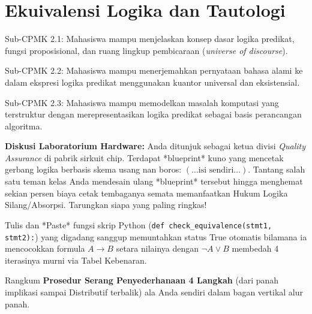 \documentclass[../main]{subfiles}
\begin{document}
\chapter{Ekuivalensi Logika dan Tautologi}

\begin{subcpmk}
  \item Sub-CPMK 2.1: Mahasiswa mampu menjelaskan konsep dasar logika predikat, fungsi proposisional, dan ruang lingkup pembicaraan (\textit{universe of discourse}).
  \item Sub-CPMK 2.2: Mahasiswa mampu menerjemahkan pernyataan bahasa alami ke dalam ekspresi logika predikat menggunakan kuantor universal dan eksistensial.
  \item Sub-CPMK 2.3: Mahasiswa mampu memodelkan masalah komputasi yang terstruktur dengan merepresentasikan logika predikat sebagai basis perancangan algoritma.
\end{subcpmk}










\begin{aktivitas}
  \item \textbf{Diskusi Laboratorium Hardware:} Anda ditunjuk sebagai ketua divisi \textit{Quality Assurance} di pabrik sirkuit chip. Terdapat *blueprint* kuno yang mencetak gerbang logika berbasis skema usang nan boros: $(\dots \text{isi sendiri} \dots)$. Tantang salah satu teman kelas Anda mendesain ulang *blueprint* tersebut hingga menghemat sekian persen biaya cetak tembaganya semata memanfaatkan Hukum Logika Silang/Absorpsi. Tarungkan siapa yang paling ringkas!
  \item Tulis dan *Paste* fungsi skrip Python (\texttt{def check\_equivalence(stmt1, stmt2):}) yang digadang sanggup memuntahkan status True otomatis bilamana ia mencocokkan formula $A \rightarrow B$ setara nilainya dengan $\neg A \vee B$ membedah 4 iterasinya murni via Tabel Kebenaran.
  \item Rangkum \textbf{Prosedur Serang Penyederhanaan 4 Langkah} (dari panah implikasi sampai Distributif terbalik) ala Anda sendiri dalam bagan vertikal alur panah.
\end{aktivitas}
\end{document}
